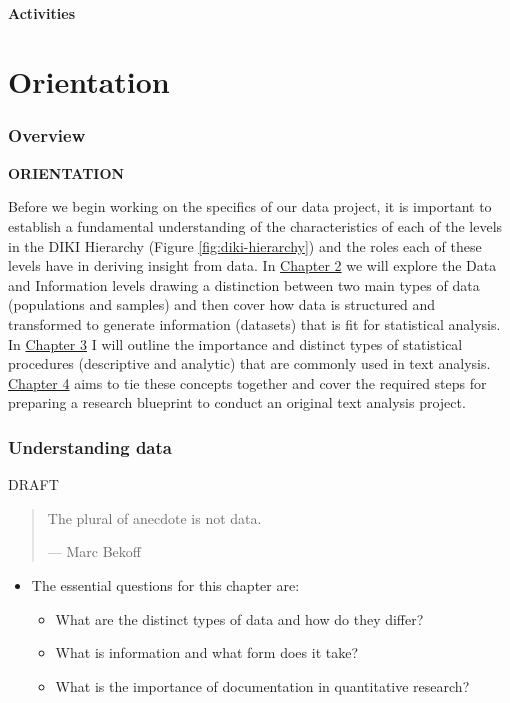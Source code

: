 \documentclass[
]{article}
\providecommand{\tightlist}{%
  \setlength{\itemsep}{0pt}\setlength{\parskip}{0pt}}
\newenvironment{rmdblock}[1]
  {\begin{shaded*}
  \begin{itemize}
  \renewcommand{\labelitemi}{
    \raisebox{-.5\height}[0pt][0pt]{
      {\setkeys{Gin}{width=2em,keepaspectratio}\texttt{[image: assets/images/\#1]}}
    }
  }
  \item
  }
  {
  \end{itemize}
  \end{shaded*}
  }
\newenvironment{rmdkey}
  {\begin{rmdblock}{key}}
  {\end{rmdblock}}
\begin{document}
\hypertarget{activities}{%
\subsection*{Activities}\label{activities}}

\hypertarget{part-orientation}{%
\part{Orientation}\label{part-orientation}}

\hypertarget{orientation-overview}{%
\section*{Overview}\label{orientation-overview}}

\textbf{ORIENTATION}

Before we begin working on the specifics of our data project, it is important to establish a fundamental understanding of the characteristics of each of the levels in the DIKI Hierarchy (Figure \ref{fig:diki-hierarchy}) and the roles each of these levels have in deriving insight from data. In \protect\hyperlink{understanding-data}{Chapter 2} we will explore the Data and Information levels drawing a distinction between two main types of data (populations and samples) and then cover how data is structured and transformed to generate information (datasets) that is fit for statistical analysis. In \protect\hyperlink{approaching-analysis}{Chapter 3} I will outline the importance and distinct types of statistical procedures (descriptive and analytic) that are commonly used in text analysis. \protect\hyperlink{framing-research}{Chapter 4} aims to tie these concepts together and cover the required steps for preparing a research blueprint to conduct an original text analysis project.

\hypertarget{understanding-data}{%
\section{Understanding data}\label{understanding-data}}

DRAFT

\begin{quote}
The plural of anecdote is not data.

--- Marc Bekoff
\end{quote}

\begin{rmdkey}
The essential questions for this chapter are:

\begin{itemize}
\tightlist
\item
  What are the distinct types of data and how do they differ?
\item
  What is information and what form does it take?
\item
  What is the importance of documentation in quantitative research?
\end{itemize}
\end{rmdkey}
\end{document}
